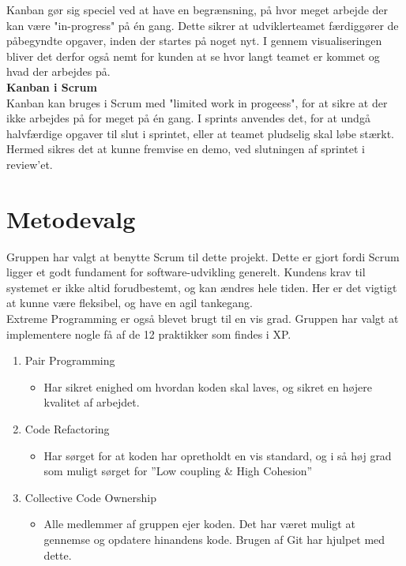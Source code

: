 Kanban gør sig speciel ved at have en begrænsning, på hvor meget arbejde der kan være "in-progress" på én gang. 
Dette sikrer at udviklerteamet færdiggører de påbegyndte opgaver, inden der startes på noget nyt. 
I gennem visualiseringen bliver det derfor også nemt for kunden at se hvor langt teamet er kommet og
hvad der arbejdes på.\\

\textbf{Kanban i Scrum}\\
Kanban kan bruges i Scrum med "limited work in progeess", for at sikre at der ikke arbejdes på for meget på én gang.
I sprints anvendes det, for at undgå halvfærdige opgaver til slut i sprintet, eller at teamet pludselig skal løbe stærkt.
Hermed sikres det at kunne fremvise en demo, ved slutningen af sprintet i review'et.\\
 
\section{Metodevalg}\label{sec:valgafvaektoej}
Gruppen har valgt at benytte Scrum til dette projekt. Dette er gjort fordi Scrum ligger et godt fundament 
for software-udvikling generelt. Kundens krav til systemet er ikke altid forudbestemt, og kan ændres hele tiden. 
Her er det vigtigt at kunne være fleksibel, og have en agil tankegang. \\

Extreme Programming er også blevet brugt til en vis grad. Gruppen har valgt at implementere nogle få 
af de 12 praktikker som findes i XP. 
\begin{enumerate}
    \item Pair Programming
    \begin{itemize}
        \item Har sikret enighed om hvordan koden skal laves, og sikret en højere kvalitet af arbejdet.
    \end{itemize}

    \item Code Refactoring
    \begin{itemize}
        \item Har sørget for at koden har opretholdt en vis standard, og i så høj grad som muligt sørget for ”Low coupling \& High Cohesion”
    \end{itemize}
    
    \item Collective Code Ownership
    \begin{itemize}
        \item Alle medlemmer af gruppen ejer koden. Det har været muligt at gennemse og opdatere hinandens kode. 
        Brugen af Git har hjulpet med dette. 
    \end{itemize}
\end{enumerate}

